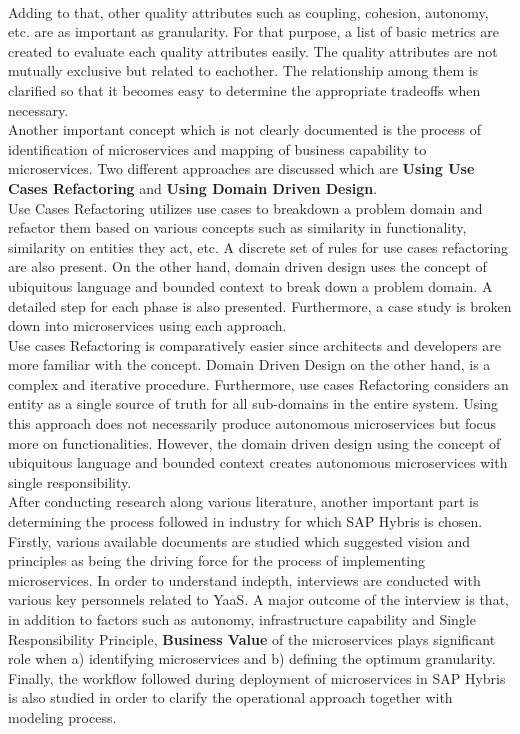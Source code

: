 \\
Adding to that, other quality attributes such as coupling, cohesion, autonomy, etc. are as important as granularity. For that purpose, a list of basic metrics are created to evaluate each quality attributes easily. The quality attributes are not mutually exclusive but related to eachother. The relationship among them is clarified so that it becomes easy to determine the appropriate tradeoffs when necessary.\\
Another important concept which is not clearly documented is the process of identification of microservices and mapping of business capability to microservices. Two different approaches are discussed which are \textbf{Using Use Cases Refactoring} and  \textbf{Using Domain Driven Design}.\\
Use Cases Refactoring utilizes use cases to breakdown a problem domain and refactor them based on various concepts such as similarity in functionality, similarity on entities they act, etc. A discrete set of rules for use cases refactoring are also present. On the other hand, domain driven design uses the concept of ubiquitous language and bounded context to break down a problem domain. A detailed step for each phase is also presented. Furthermore, a case study is broken down into microservices using each approach.\\
Use cases Refactoring is comparatively easier since architects and developers are more familiar with the concept. Domain Driven Design on the other hand, is a complex and iterative procedure. Furthermore, use cases Refactoring considers an entity as a single source of truth for all sub-domains in the entire system. Using this approach does not necessarily produce autonomous microservices but focus more on functionalities. However, the domain driven design using the concept of ubiquitous language and bounded context creates autonomous microservices with single responsibility.\\
After conducting research along various literature, another important part is determining the process followed in industry for which SAP Hybris is chosen. Firstly, various available documents are studied which suggested vision and principles as being the driving force for the process of implementing microservices. In order to understand indepth, interviews are conducted with various key personnels related to \acrshort{YaaS}. A major outcome of the interview is that, in addition to factors such as autonomy, infrastructure capability and Single Responsibility Principle, \textbf{Business Value} of the microservices plays significant role when a) identifying microservices  and b) defining the optimum granularity. Finally, the workflow followed during deployment of microservices in SAP Hybris is also studied in order to clarify the operational approach together with modeling process.\\
